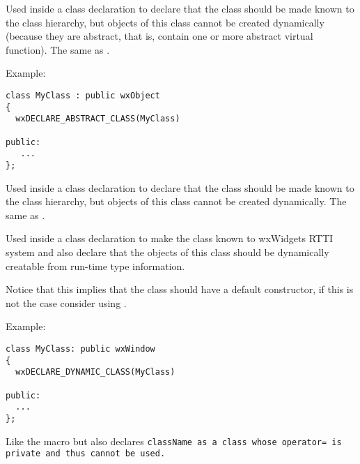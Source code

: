 \label{wxdeclareabstractclass}


Used inside a class declaration to declare that the class should be
made known to the class hierarchy, but objects of this class cannot be created
dynamically (because they are abstract, that is, contain one or more abstract
virtual function). 
The same as .

Example:

\begin{verbatim}
class MyClass : public wxObject
{
  wxDECLARE_ABSTRACT_CLASS(MyClass)

public:
   ...
};
\end{verbatim}


\label{wxdeclareclass}


Used inside a class declaration to declare that the class should be
made known to the class hierarchy, but objects of this class cannot be created
dynamically. The same as .


\label{wxdeclaredynamicclass}


Used inside a class declaration to make the class known to wxWidgets RTTI
system and also declare that the objects of this class should be dynamically
creatable from run-time type information. 

Notice that this implies that the
class should have a default constructor, if this is not the case consider using
.

Example:

\begin{verbatim}
class MyClass: public wxWindow
{
  wxDECLARE_DYNAMIC_CLASS(MyClass)

public:
  ...
};
\end{verbatim}


\label{wxdeclaredynamicclassnoassign}


Like the 
macro but also declares \tt{className} as a class whose \tt{operator=} is private
and thus cannot be used. 

